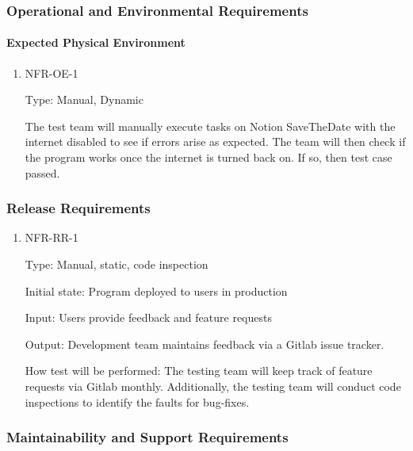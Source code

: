 \documentclass[12pt, titlepage]{article}
\begin{document}
\subsubsection{Operational and Environmental Requirements}

\paragraph{Expected Physical Environment}

\begin{enumerate}

\item{NFR-OE-1\\}

Type: Manual, Dynamic 

The test team will manually execute tasks on Notion SaveTheDate with the internet disabled to see if errors arise as expected. The team will then check if the program works once the internet is turned back on. If so, then test case passed. 

\end{enumerate}

\subsubsection{Release Requirements}

\begin{enumerate}

\item{NFR-RR-1\\}

Type: Manual, static, code inspection 

Initial state: Program deployed to users in production 

Input: Users provide feedback and feature requests 

Output: Development team maintains feedback via a Gitlab issue tracker. 

How test will be performed: The testing team will keep track of feature requests via Gitlab monthly. Additionally, the testing team will conduct code inspections to identify the faults for bug-fixes.

\end{enumerate}

\subsubsection{Maintainability and Support Requirements}
\end{document}
